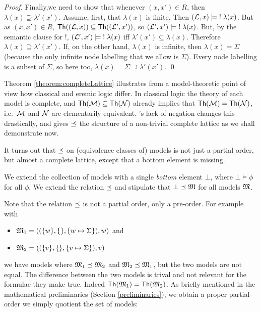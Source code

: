 \begin{proof}
Finally,we need to show that whenever $(x,x') \in R$, then $\lambda(x)
\supseteq \lambda'(x')$.  Assume, first, that $\lambda(x)$ is finite.
Then $(\mathcal{L}, x) \models \; ! \; \lambda(x)$.  But as $(x,x') \in R$,
$\mathsf{Th}((\mathcal{L}, x)) \subseteq \mathsf{Th}((\mathcal{L}', x')) $, so $(\mathcal{L}', x')
\models \; ! \; \lambda(x)$.  But, by the semantic clause for $!$,
$(\mathcal{L}', x') \models \; ! \; \lambda(x)$ iff $\lambda'(x') \subseteq
\lambda(x)$.  Therefore $\lambda(x) \supseteq \lambda'(x')$.  If, on
the other hand, $\lambda(x)$ is infinite, then $\lambda(x) = \Sigma$
(because the only infinite node labelling that we allow is
$\Sigma$). Every node labelling is a subset of $\Sigma$, so here too,
$\lambda(x) = \Sigma \supseteq \lambda'(x')$.  \qed
\end{proof}

\NI Theorem \ref{theorem:completeLattice} illustrates from a
model-theoretic point of view how classical and eremic logic
differ. In classical logic the theory of each model is complete, and
$\mathsf{Th}(\mathcal{M}) \subseteq \mathsf{Th}(\mathcal{N})$ already implies that
$\mathsf{Th}(\mathcal{M}) = \mathsf{Th}(\mathcal{N})$, i.e.~$\mathcal{M}$ and $\mathcal{N}$
are elementarily equivalent. \ELFULL{}'s lack of negation changes
this drastically, and gives $\preceq$ the structure of a non-trivial
complete lattice as we shall demonstrate now.

It turns out that $\preceq $ on (equivalence classes of) models is
not just a partial order, but almost a complete lattice, except that a
bottom element is missing.

\begin{definition}
We extend the collection of models with a single \emph{bottom} element
$\bot$, where $\bot \models \phi$ for all $\phi$. 
We extend the relation $\preceq $  and stipulate that $\bot
\preceq \frak{M}$ for all models $\frak{M}$.
\end{definition}

\NI Note that the relation $\preceq$ is not a partial order, only a
pre-order. For example with
\begin{itemize}

\item $\frak{M}_1 = ( (\{w\}, \{\}, \{w \mapsto \Sigma\}), w)$ and
\item $\frak{M}_2 = ( (\{v\}, \{\}, \{v \mapsto \Sigma\}), v)$ 

\end{itemize}

\NI we have models where $\frak{M}_1 \preceq \frak{M}_2$ and $\frak{M}_2
\preceq \frak{M}_1$, but the two models are not equal. The difference
between the two models is trival and not relevant for the formulae
they make true. Indeed $\mathsf{Th}(\frak{M}_1) = \mathsf{Th}(\frak{M}_2)$.  As
briefly mentioned in the mathematical preliminaries (Section
\ref{preliminaries}), we obtain a proper partial-order we simply
quotient the set of models:

